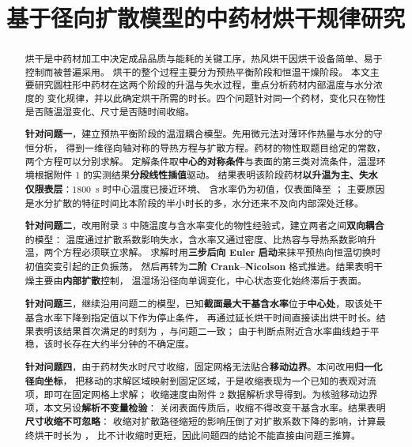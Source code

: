 \documentclass[12pt,a4paper]{ctexart}
\title{基于径向扩散模型的中药材烘干规律研究}
\author{}
\date{}
\begin{document}
\maketitle

\begin{abstract}
\begin{small}\linespread{1.22}\selectfont
\setlength{\parskip}{1pt}
烘干是中药材加工中决定成品品质与能耗的关键工序，热风烘干因烘干设备简单、易于控制而被普遍采用。
烘干的整个过程主要分为预热平衡阶段和恒温干燥阶段。
本文主要研究圆柱形中药材在这两个阶段的升温与失水过程，重点分析药材内部温度与水分浓度的
变化规律，并以此确定烘干所需的时长。四个问题针对同一个药材，变化只在物性是否随温湿变化、尺寸是否随时间收缩。

\textbf{针对问题一}，建立预热平衡阶段的温湿耦合模型。先用微元法对薄环作热量与水分的守恒分析，
得到一维径向轴对称的导热方程与扩散方程。药材的物性取题目给定的常数，两个方程可以分别求解。
定解条件取\textbf{中心的对称条件}与表面的第三类对流条件，温湿环境根据附件 1 的实测结果\textbf{分段线性插值}驱动。
结果表明该阶段药材\textbf{以升温为主、失水仅限表层}：$1800$~s 时中心温度已接近环境、
含水率仍为初值，仅表面降至 \qoneCsurfaceoneeightzerozeros；
主要原因是水分扩散的特征时间比本阶段的半小时长的多，水分还来不及向内部深处迁移。

\textbf{针对问题二}，改用附录 3 中随温度与含水率变化的物性经验式，建立两者之间\textbf{双向耦合}的模型：
温度通过扩散系数影响失水，含水率又通过密度、比热容与导热系数影响升温，两个方程必须联立求解。
求解时用\textbf{三步后向 Euler 启动}来抹平预热向恒温切换时初值突变引起的正负振荡，
然后再转为\textbf{二阶 Crank--Nicolson} 格式推进。结果表明干燥主要由\textbf{内部扩散}控制，
温湿场沿径向单调变化，中心状态变化始终滞后于表面。

\textbf{针对问题三}，继续沿用问题二的模型，已知\textbf{截面最大干基含水率}位于\textbf{中心处}，取该处干基含水率下降到指定值以下作为停止条件，
再通过延长烘干时间直接读出烘干时长。结果表明该结果首次满足的时刻为 \qtwodryingtime，与问题二一致；
由于判断点附近含水率曲线趋于平稳，该时长存在大约半分钟的不确定度。

\textbf{针对问题四}，由于药材失水时尺寸收缩，固定网格无法贴合\textbf{移动边界}。本问改用\textbf{归一化径向坐标}，
把移动的求解区域映射到固定区域，于是收缩表现为一个已知的表观对流项，即可在固定网格上求解；
收缩速度由附件 2 数据解析求导得到。为核验移动边界项，本文另设\textbf{解析不变量检验}：
关闭表面传质后，收缩不得改变干基含水率。结果表明\textbf{尺寸收缩不可忽略}：
收缩对扩散路径缩短的影响压倒了对扩散系数下降的影响，计算最终烘干时长为 \qfourdryingtimehours，
比不计收缩时更短，因此问题四的结论不能直接由问题三推算。


\end{small}
\end{abstract}
\end{document}

